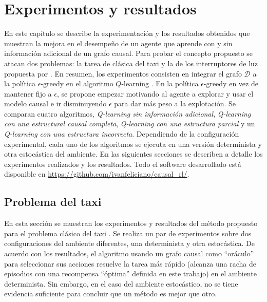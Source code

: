 \chapter{Experimentos y resultados}\label{chapter5}

\graphicspath{{Chapter5/Figs/}}


En este capítulo se describe la experimentación y los resultados obtenidos
que muestran la mejora en el desempeño de un agente que aprende
con y sin información adicional de un grafo causal.
Para probar el concepto propuesto se atacan dos problemas: la tarea de clásica del taxi \cite{Dietterich:2000:HRL:1622262.1622268} y la de los
interruptores de luz propuesta por \cite{nair2019causal}.
En resumen, los experimentos consisten en integrar el grafo $\mathcal{D}$ a la política $\epsilon$-greedy
en el algoritmo $Q$-learning \cite{watkins1992q}.
En la política $\epsilon$-greedy en vez de mantener fijo a $\epsilon$, se propone empezar motivando al agente a explorar y usar
el modelo causal e ir disminuyendo $\epsilon$ para dar más peso a la explotación.
Se comparan cuatro algoritmos, \textit{Q-learning sin información
adicional}, \textit{Q-learning con una estructural causal completa}, \textit{Q-learning con una estructura parcial} y un \textit{Q-learning con una estructura incorrecta}.
Dependiendo de la configuración experimental, cada uno de los algoritmos se ejecuta en una versión determinista y otra estocástica del ambiente. 
En las siguientes secciones se describen a detalle los experimentos realizados y los resultados. Todo el software desarrollado está 
disponible en \url{https://github.com/ivanfeliciano/causal_rl/}.


\section{Problema del taxi}\label{sec:exp-taxi}

En esta sección se muestran los experimentos y resultados del método propuesto para el problema clásico del taxi \cite{Dietterich:2000:HRL:1622262.1622268}.
Se realiza un par de experimentos sobre dos configuraciones del ambiente diferentes,
una determinista y otra estocástica. De acuerdo con los resultados, 
el algoritmo usando un grafo causal como ``oráculo'' para seleccionar sus acciones
resuelve la tarea más rápido (alcanza una racha de episodios con una recompensa ``óptima'' definida en este trabajo) en el ambiente determinista. Sin embargo, en el 
caso del ambiente estocástico, no se tiene evidencia suficiente para concluir que un
método es mejor que otro.


